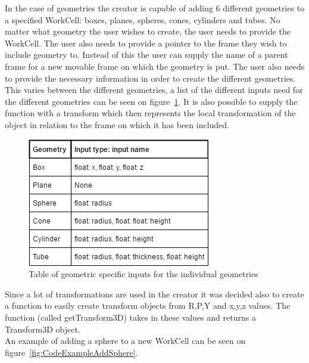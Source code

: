 In the case of geometries the creator is capable of adding 6 different geometries to a specified WorkCell: boxes, planes, spheres, cones, cylinders and tubes. No matter what geometry the user wishes to create, the user needs to provide the WorkCell. The user also needs to provide a pointer to the frame they wish to include geometry to. Instead of this the user can supply the name of a parent frame for a new movable frame on which the geometry is put. The user also needs to provide the necessary information in order to create the different geometries. This varies between the different geometries, a list of the different inputs need for the different geometries can be seen on figure~\ref{fig:InputsForGeoms}. It is also possible to supply the function with a transform which then represents the local transformation of the object in relation to the frame on which it has been included.\\

\begin{figure}[h]
	\centering
	\includegraphics[scale=0.55]{Figures/InputsForGeoms.png}
	\caption{Table of geometric specific inputs for the individual geometries}
	\label{fig:InputsForGeoms}
\end{figure}

Since a lot of transformations are used in the creator it was decided also to create a function to easily create transform objects from R,P,Y and x,y,z values. The function (called getTransform3D) takes in these values and returns a Transform3D object.\\

An example of adding a sphere to a new WorkCell can be seen on figure~\ref{fig:CodeExampleAddSphere}.

